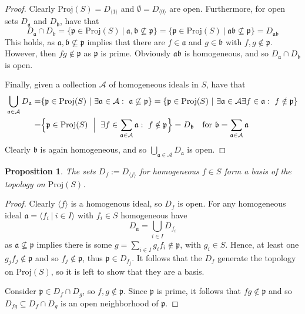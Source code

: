 \documentclass{scrartcl}
\newcommand{\p}{\mathfrak{p}}
\renewcommand{\a}{\mathfrak{a}}
\renewcommand{\b}{\mathfrak{b}}
\newcommand{\Proj}{\mathrm{Proj}}
\newtheorem{prop}{Proposition}
\theoremstyle{definition}
\begin{document}
\begin{proof}
    Clearly $\Proj(S) = D_{\langle 1 \rangle}$ and $\emptyset = D_{\langle 0 \rangle}$ are open.
    Furthermore, for open sets $D_\a$ and $D_\b$, have that
    \begin{equation*}
        D_\a \cap D_\b = \{ \p \in \Proj(S) \ | \ \a, \b \not\subseteq \p \} = \{ \p \in \Proj(S) \ | \ \a\b \not\subseteq \p \} = D_{\a\b}
    \end{equation*}
    This holds, as $\a, \b \not\subseteq \p$ implies that there are $f \in \a$ and $g \in \b$ with $f, g \notin \p$.
    However, then $fg \notin \p$ as $\p$ is prime.
    Obviously $\a\b$ is homogeneous, and so $D_\a \cap D_\b$ is open.

    Finally, given a collection $\mathcal{A}$ of homogeneous ideals in $S$, have that
    \begin{align*}
        \bigcup_{\a \in \mathcal{A}} D_\a =& \{ \p \in \Proj(S) \ | \ \exists \a \in \mathcal{A}:\ \a \not\subseteq \p \} = \{ \p \in \Proj(S) \ | \ \exists \a \in \mathcal{A} \exists f \in \a:\ f \notin \p \} \\
        =& \Bigl\{ \p \in \Proj(S) \ \Bigm| \ \exists f \in \sum_{\a \in \mathcal{A}} \a:\ f \notin \p \Bigr\} = D_{\b} \quad \text{for $\b = \sum_{\a \in \mathcal{A}} \a$}
    \end{align*}
    Clearly $\b$ is again homogeneous, and so $\bigcup_{\a \in \mathcal{A}} D_\a$ is open.
\end{proof}
\begin{prop}
    The sets $D_f := D_{\langle f \rangle}$ for homogeneous $f \in S$ form a basis of the topology on $\Proj(S)$.
\end{prop}
\begin{proof}
    Clearly $\langle f \rangle$ is a homogenous ideal, so $D_f$ is open.
    For any homogeneous ideal $\a = \langle f_i \ | \ i \in I \rangle$ with $f_i \in S$ homogeneous have
    \begin{equation*}
        D_\a = \bigcup_{i \in I} D_{f_i}
    \end{equation*}
    as $\a \not\subseteq \p$ implies there is some $g = \sum_{i \in I} g_i f_i \notin \p$, with $g_i \in S$.
    Hence, at least one $g_j f_j \notin \p$ and so $f_j \notin \p$, thus $\p \in D_{f_j}$.
    It follows that the $D_f$ generate the topology on $\Proj(S)$, so it is left to show that they are a basis.

    Consider $\p \in D_f \cap D_g$, so $f, g \notin \p$.
    Since $\p$ is prime, it follows that $fg \notin \p$ and so $D_{fg} \subseteq D_f \cap D_g$ is an open neighborhood of $\p$.
\end{proof}
\end{document}
